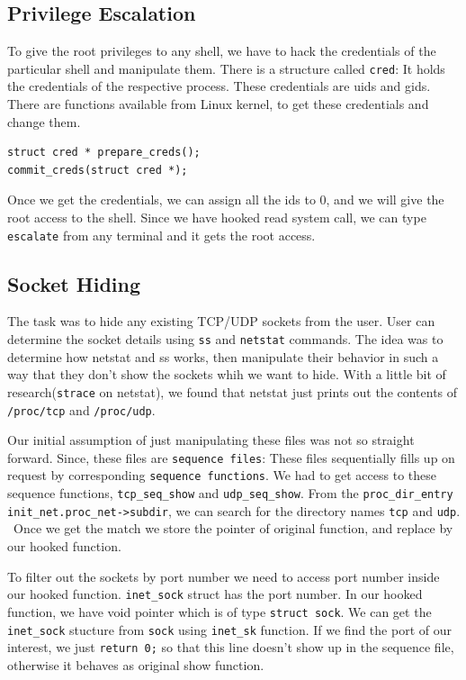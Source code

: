 \documentclass[10pt, letterpaper]{scrartcl}
\begin{document}
\subsection{Privilege Escalation}
To give the root privileges to any shell, we have to hack the credentials of the particular shell and 
manipulate them. There is a structure called \texttt{cred}: 
It holds the credentials of the respective process. These credentials are uids and gids. 
There are functions available from Linux kernel, to get these credentials and change them. 

\begin{verbatim}
struct cred * prepare_creds();
commit_creds(struct cred *);
\end{verbatim}

Once we get the credentials, we can assign all the ids to 0, and we will give the root access to the shell. 
Since we have hooked read system call, 
we can type \texttt{escalate} from any terminal and it gets the root access. 

\subsection{Socket Hiding}
The task was to hide any existing TCP/UDP sockets from the user. 
User can determine the socket details using \texttt{ss} and \texttt{netstat} commands.
The idea was to determine how netstat and ss works, 
then manipulate their behavior in such a way that they don't show the sockets whih we want to hide. 
With a little bit of research(\texttt{strace} on netstat), 
we found that netstat just prints out the contents of \texttt{/proc/tcp} and \texttt{/proc/udp}.

Our initial assumption of just manipulating these files was not so straight forward. 
Since, these files are \texttt{sequence files}: 
These files sequentially fills up on request by corresponding \texttt{sequence functions}. 
We had to get access to these sequence functions, \texttt{tcp\_seq\_show} and \texttt{udp\_seq\_show}. 
From the \texttt{proc\_dir\_entry} \texttt{init\_net.proc\_net->subdir}, 
we can search for the directory names \texttt{tcp} and \texttt{udp}. \
Once we get the match we store the pointer of original function, and replace by our hooked function. 

To filter out the sockets by port number we need to access port number inside our hooked function. 
\texttt{inet\_sock} struct has the port number. 
In our hooked function, we have void pointer which is of type \texttt{struct sock}. 
We can get the \texttt{inet\_sock} stucture from \texttt{sock} using \texttt{inet\_sk} function. 
If we find the port of our interest, we just \texttt{return 0;} so that this line doesn't show up in the 
sequence file, otherwise it behaves as original show function. 
\end{document}
